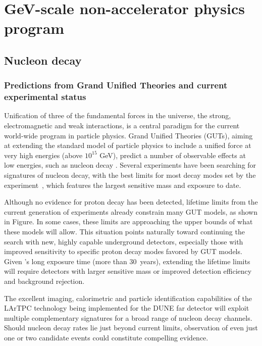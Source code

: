 \chapter{GeV-scale non-accelerator physics program}
\label{ch:nonaccel}


\section{Nucleon decay}
\label{sec:nonaccel-ndk}

\subsection{Predictions from Grand Unified Theories and current experimental status}
\label{subsec:nonaccel-ndk-status}

Unification of three of the fundamental forces in the universe, the strong, 
electromagnetic and weak interactions, is a central paradigm for the current 
world-wide program in particle physics. Grand Unified Theories (GUTs), aiming 
at extending the standard model of particle physics to include a unified force 
at very high energies  (above $10^{15}$ GeV), predict a number of observable 
effects at low energies, such as nucleon  decay \cite{Pati:1973rp,Georgi:1974sy,Dimopoulos:1981dw,Langacker:1980js,deBoer:1994dg,Nath:2006ut}. Several experiments have been searching for signatures of nucleon decay, with the best limits for most decay modes set by the \superk experiment~\cite{Miura:2016krn,Abe:2014mwa,TheSuper-Kamiokande:2017tit}, 
which features the largest sensitive mass and exposure to date. 

Although no evidence for proton decay has been detected, lifetime limits from the current generation of experiments already constrain many GUT models, as shown in Figure. In some cases, these limits are approaching the upper bounds of what these models will allow. This situation points naturally toward continuing the search with new, highly capable underground detectors, especially those with improved sensitivity to specific proton decay modes favored by GUT models. Given \superk's long exposure time (more than 30~years), extending the lifetime limits will require detectors with larger sensitive mass or improved detection efficiency and background rejection.  

The excellent imaging, calorimetric and particle identification capabilities of the LArTPC technology being implemented for the DUNE far detector will exploit multiple complementary signatures for a broad range of nucleon decay channels.  Should nucleon decay rates lie just beyond current limits, observation of even just one or two candidate events could constitute compelling evidence.

